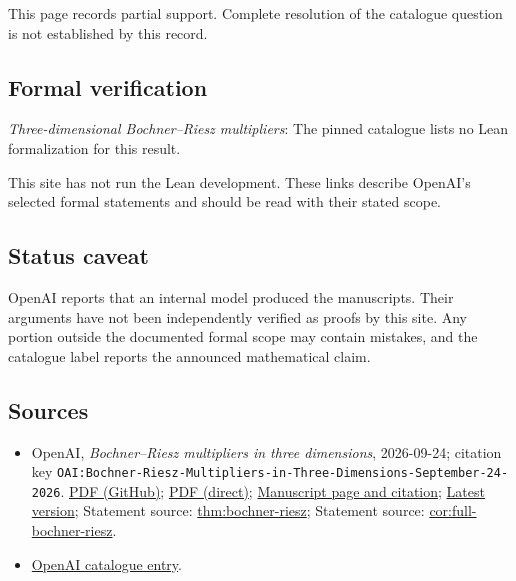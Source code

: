 \documentclass[11pt]{article}
\begin{document}
This page records partial support. Complete resolution of the catalogue question is not established by this record.

\subsection{Formal verification}
\textit{Three-dimensional Bochner--Riesz multipliers}: The pinned catalogue lists no Lean formalization for this result.

This site has not run the Lean development. These links describe OpenAI’s selected formal statements and should be read with their stated scope.

\subsection{Status caveat}
OpenAI reports that an internal model produced the manuscripts. Their arguments have not been independently verified as proofs by this site. Any portion outside the documented formal scope may contain mistakes, and the catalogue label reports the announced mathematical claim.

\subsection{Sources}
\begin{itemize}
\item OpenAI, \emph{Bochner–Riesz multipliers in three dimensions}, 2026-09-24; citation key \texttt{OAI:Bochner-Riesz-Multipliers-in-Three-Dimensions-September-24-2026}. \href{https://github.com/openai/math/blob/adc7f1241b42e322a6451854ab7e4b4c146bf78a/preprints/Bochner-Riesz-Multipliers-in-Three-Dimensions-September-24-2026/Bochner-Riesz-Multipliers-in-Three-Dimensions-September-24-2026.pdf}{PDF (GitHub)}; \href{https://github.com/openai/math/raw/adc7f1241b42e322a6451854ab7e4b4c146bf78a/preprints/Bochner-Riesz-Multipliers-in-Three-Dimensions-September-24-2026/Bochner-Riesz-Multipliers-in-Three-Dimensions-September-24-2026.pdf}{PDF (direct)}; \href{https://github.com/openai/math/blob/adc7f1241b42e322a6451854ab7e4b4c146bf78a/preprints/Bochner-Riesz-Multipliers-in-Three-Dimensions-September-24-2026/README.md}{Manuscript page and citation}; \href{https://github.com/openai/math/blob/main/preprints/Bochner-Riesz-Multipliers-in-Three-Dimensions-September-24-2026/Bochner-Riesz-Multipliers-in-Three-Dimensions-September-24-2026.pdf}{Latest version}; Statement source: \href{https://github.com/openai/math/blob/adc7f1241b42e322a6451854ab7e4b4c146bf78a/preprints/Bochner-Riesz-Multipliers-in-Three-Dimensions-September-24-2026/build/sections/01-introduction.tex\#L21}{thm:bochner-riesz}; Statement source: \href{https://github.com/openai/math/blob/adc7f1241b42e322a6451854ab7e4b4c146bf78a/preprints/Bochner-Riesz-Multipliers-in-Three-Dimensions-September-24-2026/build/sections/12-multiplier.tex\#L437}{cor:full-bochner-riesz}.
\item \href{https://github.com/openai/math/blob/adc7f1241b42e322a6451854ab7e4b4c146bf78a/CONTENTS.md}{OpenAI catalogue entry}.
\end{itemize}
\end{document}

